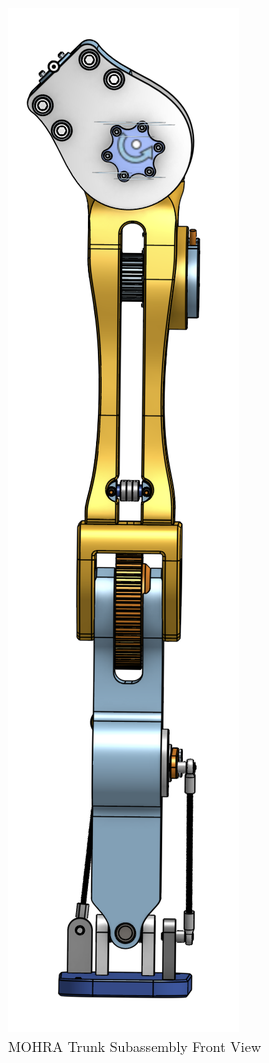 \documentclass{article}
\begin{document}
\begin{figure}[H]
    \centering
    \includegraphics[scale=0.8]{assets/Design Presentation/Leg Front View.png}
    \caption{MOHRA Trunk Subassembly Front View}
    \label{fig:enter-label}
\end{figure}
\end{document}
